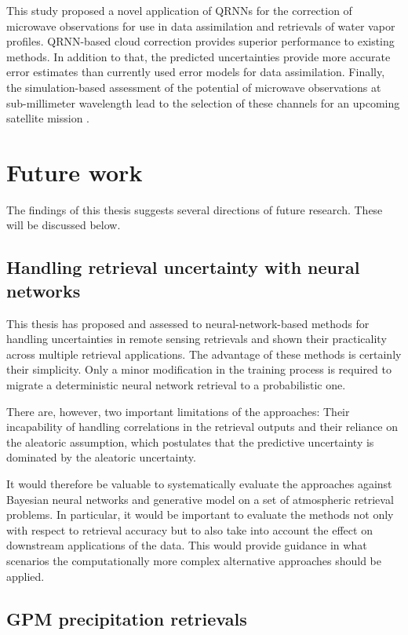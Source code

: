 {This study proposed a novel application of QRNNs for the correction of microwave
observations for use in data assimilation and retrievals of water vapor
profiles. QRNN-based cloud correction provides superior performance to existing
methods. In addition to that, the predicted uncertainties provide more accurate
error estimates than currently used error models for data assimilation.
Finally, the simulation-based assessment of the potential of microwave observations
at sub-millimeter wavelength lead to the selection of these channels for an
upcoming satellite mission \citep{arctic_weather_satellite}.

\section{Future work}

The findings of this thesis suggests several directions of future research.
These will be discussed below.

\subsection{Handling retrieval uncertainty with neural networks}

This thesis has proposed and assessed to neural-network-based methods for
handling uncertainties in remote sensing retrievals and shown their practicality
across multiple retrieval applications. The advantage of these methods is
certainly their simplicity. Only a minor modification in the training process is
required to migrate a deterministic neural network retrieval to a probabilistic
one.

There are, however, two important limitations of the approaches: Their
incapability of handling correlations in the retrieval outputs and their
reliance on the aleatoric assumption, which postulates that the predictive
uncertainty is dominated by the aleatoric uncertainty.

It would therefore be valuable to systematically evaluate the approaches against
Bayesian neural networks and generative model on a set of atmospheric retrieval
problems. In particular, it would be important to evaluate the methods not only
with respect to retrieval accuracy but to also take into account the effect on
downstream applications of the data. This would provide guidance in what scenarios
the computationally more complex alternative approaches should be applied.

\subsection{GPM precipitation retrievals}

}
